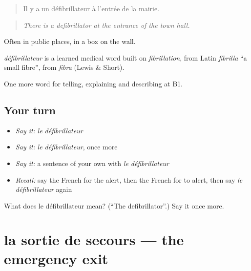 \begin{quote}
Il y a un défibrillateur à l'entrée de la mairie.
\end{quote}

\begin{quote}
\emph{There is a defibrillator at the entrance of the town hall.}
\end{quote}

Often in public places, in a box on the wall.

\begin{cousinweb}
\emph{défibrillateur} is a learned medical word built on \emph{fibrillation}, from Latin \emph{fibrilla} \textquotedblleft{}a small fibre\textquotedblright{}, from \emph{fibra} (Lewis \& Short).
\end{cousinweb}

\begin{grammarlens}[title={What you've built}]
One more word for telling, explaining and describing at B1.
\end{grammarlens}

\subsection*{Your turn}
\begin{itemize}
\raggedright
  \item \emph{Say it:} \emph{le défibrillateur}
  \item \emph{Say it:} \emph{le défibrillateur}, once more
  \item \emph{Say it:} a sentence of your own with \emph{le défibrillateur}
  \item \emph{Recall:} say the French for the alert, then the French for to alert, then say \emph{le défibrillateur} again
\end{itemize}

\begin{tcolorbox}[breakable,colback=teal!4,colframe=teal!35!black,title={Before you move on}]
What does le défibrillateur mean? (\textquotedblleft{}The defibrillator\textquotedblright{}.) Say it once more.
\end{tcolorbox}
\section[la sortie de secours]{la sortie de secours — the emergency exit}

\label{lesson:FR-C301-sortie-de-secours}



